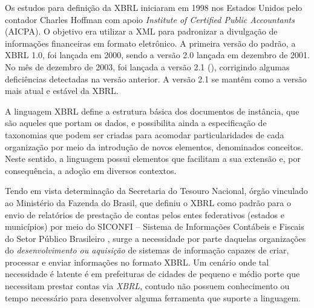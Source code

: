 \documentclass[msc,proposal,hidelot,hideabstract]{ppgccufmg} %
\begin{document}
Os estudos para definição da XBRL iniciaram em 1998 nos Estados Unidos pelo contador Charles Hoffman com apoio \textit{Institute of Certified Public Accountants} (AICPA). O objetivo era utilizar a XML para padronizar a divulgação de informações financeiras em formato eletrônico. A primeira versão do padrão, a XBRL 1.0, foi lançada em 2000, sendo a versão 2.0 lançada em dezembro de 2001. No mês de dezembro de 2003, foi lançada a versão 2.1 (\cite{hoffman_2006}), corrigindo algumas deficiências detectadas na versão anterior. A versão 2.1 se mantêm como a versão mais atual e estável da XBRL.

A linguagem XBRL define a estrutura básica dos documentos de instância, que são aqueles que portam os dados, e possibilita ainda a especificação de taxonomias que podem ser criadas para acomodar particularidades de cada organização por meio da introdução de novos elementos, denominados conceitos. Neste sentido, a linguagem possui elementos que facilitam a sua extensão e, por consequência, a adoção em diversos contextos.


Tendo em vista determinação da Secretaria do Tesouro Nacional, órgão
vinculado ao  Ministério da Fazenda do Brasil, que definiu o XBRL como
padrão para o envio de relatórios de prestação de contas pelos entes
federativos (estados e municípios) por meio do SICONFI – Sistema de Informações Contábeis e Fiscais do Setor Público Brasileiro \cite{nt_03_2013}, surge a necessidade por parte
daquelas organizações do \textit{desenvolvimento ou aquisição} de sistemas de
informação capazes de criar, processar e enviar informações no formato
XBRL. Um cenário onde tal necessidade é latente é em prefeituras de cidades de pequeno e médio porte que necessitam prestar contas via \textit{XBRL}, contudo
não possuem conhecimento ou tempo necessário para desenvolver alguma ferramenta que suporte a linguagem.
\end{document}
